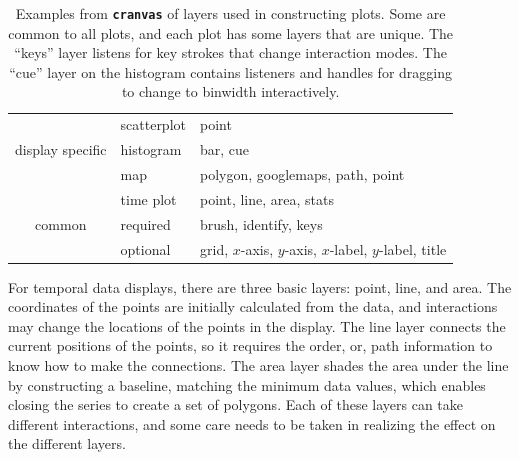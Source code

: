 \documentclass[12pt]{article}
\providecommand{\tabularnewline}{\\}
\begin{document}
\begin{center}
\begin{table}[h]
\begin{center}
\begin{tabular}{c|l|l}
\hline 
  & scatterplot & point\tabularnewline
\cline{2-3} 
display specific & histogram & bar, cue\tabularnewline
\cline{2-3} 
 & map & polygon, googlemaps, path, point\tabularnewline
\cline{2-3} 
 & time plot & point, line, area, stats\tabularnewline
\hline 
common & required & brush, identify, keys\tabularnewline
\cline{2-3} 
 & optional & grid, $x$-axis, $y$-axis, $x$-label, $y$-label, title \tabularnewline
\hline 
\end{tabular}
\end{center}

\caption{\label{tab:Layers}Examples from \texttt{\textbf{cranvas}} of layers used in constructing plots. Some are common to all plots, and each plot has some layers that are unique. The ``keys'' layer listens for key strokes that change interaction modes. The ``cue'' layer on the histogram contains listeners and handles for dragging to change to binwidth interactively.}
\end{table}

\end{center}






For temporal data displays, there are three basic layers: point, line, and area. The coordinates of the points are initially calculated from the data, and interactions may change the locations of the points in the display. The line layer connects the current positions of the points, so it requires the order, or, path information to know how to make the connections. The area layer shades the area under the line by constructing a baseline, matching the minimum data values, which enables closing the series to create a set of polygons.  %
Each of these layers can take different interactions, and some care needs to be taken in realizing the effect on the different layers. 
\end{document}
